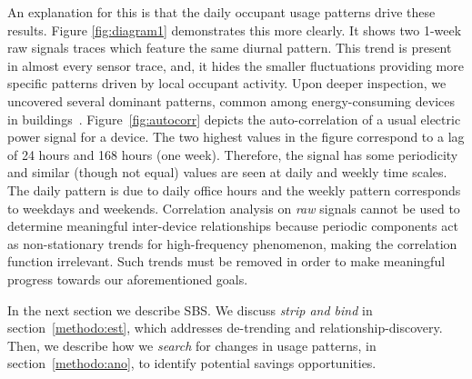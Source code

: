 An explanation for this is that the daily occupant usage patterns %
drive these results.
Figure \ref{fig:diagram1} demonstrates this more clearly.  It shows two 1-week raw signals traces which feature the same 
diurnal pattern.  
This trend is present in almost every sensor trace, and, it hides 
the smaller fluctuations providing more specific patterns driven by local occupant activity.  Upon deeper inspection, we uncovered several
 dominant patterns, common among energy-consuming devices in buildings~\cite{wrinch:pes2012}.  Figure~\ref{fig:autocorr} depicts the 
 auto-correlation of a usual electric power signal for a device.  The two highest values in the figure correspond to a lag of 24 hours and 168 hours (one week).  
 Therefore, the signal has some periodicity and similar (though not equal) values are seen at daily and weekly time scales.
The daily pattern is due to daily office hours and the weekly pattern corresponds to weekdays and weekends.  
Correlation analysis on \emph{raw} signals cannot be used to determine meaningful 
inter-device relationships because periodic components act as non-stationary trends for high-frequency phenomenon, 
 making the correlation function irrelevant.  %
Such trends must be removed in order to make meaningful progress towards our aforementioned goals.  

In the next section we describe SBS.  
We discuss \emph{strip and bind} in section~\ref{methodo:est}, which addresses de-trending and
relationship-discovery.  Then, we describe how we \emph{search} for changes in usage patterns, 
in section~\ref{methodo:ano}, to identify potential savings opportunities.

